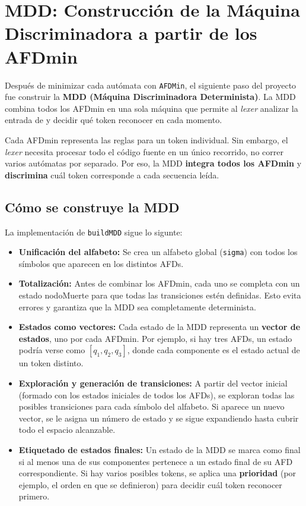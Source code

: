 \section{MDD: Construcción de la Máquina Discriminadora a partir de los AFDmin}

Después de minimizar cada autómata con \texttt{AFDMin}, el siguiente paso del proyecto fue construir la \textbf{MDD (Máquina Discriminadora Determinista)}.  
La MDD combina todos los AFDmin en una sola máquina que permite al \textit{lexer} analizar la entrada de y decidir qué token reconocer en cada momento.

Cada AFDmin representa las reglas para un token individual.  
Sin embargo, el \textit{lexer} necesita procesar todo el código fuente en un único recorrido, no correr varios autómatas por separado.  
Por eso, la MDD \textbf{integra todos los AFDmin} y \textbf{discrimina} cuál token corresponde a cada secuencia leída.

\subsection*{Cómo se construye la MDD}
La implementación de \texttt{buildMDD} sigue lo sigunte:
\begin{itemize}
  \item \textbf{Unificación del alfabeto:} Se crea un alfabeto global (\texttt{sigma}) con todos los símbolos que aparecen en los distintos AFDs.  
  \item \textbf{Totalización:} Antes de combinar los AFDmin, cada uno se completa con un estado nodoMuerte para que todas las transiciones estén definidas.  
  Esto evita errores y garantiza que la MDD sea completamente determinista.
  \item \textbf{Estados como vectores:} Cada estado de la MDD representa un \textbf{vector de estados}, uno por cada AFDmin.  
  Por ejemplo, si hay tres AFDs, un estado podría verse como \([q_1, q_2, q_3]\), donde cada componente es el estado actual de un token distinto.
  \item \textbf{Exploración y generación de transiciones:} A partir del vector inicial (formado con los estados iniciales de todos los AFDs), se exploran todas las posibles transiciones para cada símbolo del alfabeto.  
  Si aparece un nuevo vector, se le asigna un número de estado y se sigue expandiendo hasta cubrir todo el espacio alcanzable.
  \item \textbf{Etiquetado de estados finales:} Un estado de la MDD se marca como final si al menos una de sus componentes pertenece a un estado final de su AFD correspondiente.  
  Si hay varios posibles tokens, se aplica una \textbf{prioridad} (por ejemplo, el orden en que se definieron) para decidir cuál token reconocer primero.
\end{itemize}
